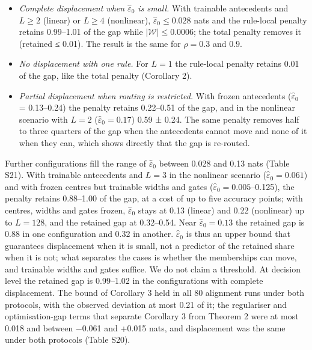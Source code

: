 \begin{itemize}
\tightlist
\item
  \emph{Complete displacement when \(\hat\varepsilon_0\) is small.} With trainable antecedents and \(L \geq 2\) (linear) or \(L \geq 4\) (nonlinear), \(\hat\varepsilon_0 \leq 0.028\) nats and the rule-local penalty retains 0.99--1.01 of the gap while \(|\mathcal W| \leq 0.0006\); the total penalty removes it (retained ≤ 0.01). The result is the same for \(\rho = 0.3\) and \(0.9\).
\item
  \emph{No displacement with one rule.} For \(L = 1\) the rule-local penalty retains 0.01 of the gap, like the total penalty (Corollary 2).
\item
  \emph{Partial displacement when routing is restricted.} With frozen antecedents (\(\hat\varepsilon_0\) = 0.13--0.24) the penalty retains 0.22--0.51 of the gap, and in the nonlinear scenario with \(L = 2\) (\(\hat\varepsilon_0 = 0.17\)) 0.59 ± 0.24. The same penalty removes half to three quarters of the gap when the antecedents cannot move and none of it when they can, which shows directly that the gap is re-routed.
\end{itemize}

Further configurations fill the range of \(\hat\varepsilon_0\) between 0.028 and 0.13 nats (Table S21). With trainable antecedents and \(L = 3\) in the nonlinear scenario (\(\hat\varepsilon_0 = 0.061\)) and with frozen centres but trainable widths and gates (\(\hat\varepsilon_0 = 0.005\)--0.125), the penalty retains 0.88--1.00 of the gap, at a cost of up to five accuracy points; with centres, widths and gates frozen, \(\hat\varepsilon_0\) stays at 0.13 (linear) and 0.22 (nonlinear) up to \(L = 128\), and the retained gap at 0.32--0.54. Near \(\hat\varepsilon_0 = 0.13\) the retained gap is 0.88 in one configuration and 0.32 in another. \(\hat\varepsilon_0\) is thus an upper bound that guarantees displacement when it is small, not a predictor of the retained share when it is not; what separates the cases is whether the memberships can move, and trainable widths and gates suffice. We do not claim a threshold. At decision level the retained gap is 0.99--1.02 in the configurations with complete displacement. The bound of Corollary 3 held in all 80 alignment runs under both protocols, with the observed deviation at most 0.21 of it; the regulariser and optimisation-gap terms that separate Corollary 3 from Theorem 2 were at most 0.018 and between −0.061 and +0.015 nats, and displacement was the same under both protocols (Table S20).

